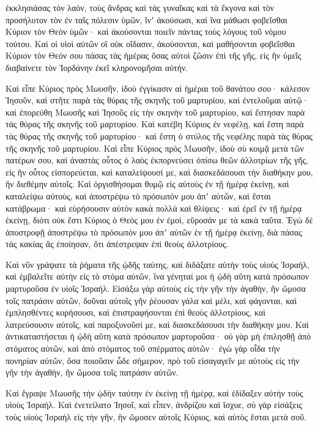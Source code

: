 {ἐκκλησιάσας τὸν λαὸν, τοὺς ἄνδρας καὶ τὰς γυναῖκας καὶ τὰ ἔκγονα καὶ τὸν προσήλυτον τὸν ἐν ταῖς πόλεσιν ὑμῶν, ἵνʼ ἀκούσωσι, καὶ ἵνα μάθωσι φοβεῖσθαι Κύριον τὸν Θεὸν ὑμῶν· καὶ ἀκούσονται ποιεῖν πάντας τοὺς λόγους τοῦ νόμου τούτου.
Καὶ οἱ υἱοὶ αὐτῶν οἳ οὐκ οἴδασιν, ἀκούσονται, καὶ μαθήσονται φοβεῖσθαι Κύριον τὸν Θεόν σου πάσας τὰς ἡμέρας ὅσας αὐτοὶ ζῶσιν ἐπὶ τῆς γῆς, εἰς ἣν ὑμεῖς διαβαίνετε τὸν Ἰορδάνην ἐκεῖ κληρονομῆσαι αὐτήν.
\par }{\PP {}Καὶ εἶπε Κύριος πρὸς Μωυσῆν, ἰδοὺ ἐγγίκασιν αἱ ἡμέραι τοῦ θανάτου σου· κάλεσον Ἰησοῦν, καὶ στῆτε παρὰ τὰς θύρας τῆς σκηνῆς τοῦ μαρτυρίου, καὶ ἐντελοῦμαι αὐτῷ· καὶ ἐπορεύθη Μωυσῆς καὶ Ἰησοῦς εἰς τὴν σκηνὴν τοῦ μαρτυρίου, καὶ ἔστησαν παρὰ τὰς θύρας τῆς σκηνῆς τοῦ μαρτυρίου.
Καὶ κατέβη Κύριος ἐν νεφέλῃ, καὶ ἔστη παρὰ τὰς θύρας τῆς σκηνῆς τοῦ μαρτυρίου· καὶ ἔστη ὁ στύλος τῆς νεφέλης παρὰ τὰς θύρας τῆς σκηνῆς τοῦ μαρτυρίου.
Καὶ εἶπε Κύριος πρὸς Μωυσῆν, ἰδοὺ σὺ κοιμᾷ μετὰ τῶν πατέρων σου, καὶ ἀναστὰς οὗτος ὁ λαὸς ἐκπορνεύσει ὀπίσω θεῶν ἀλλοτρίων τῆς γῆς, εἰς ἣν οὗτος εἰσπορεύεται, καὶ καταλείψουσί με, καὶ διασκεδάσουσι τὴν διαθήκην μου, ἣν διεθέμην αὐτοῖς.
Καὶ ὀργισθήσομαι θυμῷ εἰς αὐτοὺς ἐν τῇ ἡμέρᾳ ἐκείνῃ, καὶ καταλείψω αὐτοὺς, καὶ ἀποστρέψω τὸ πρόσωπόν μου ἀπʼ αὐτῶν, καὶ ἔσται κατάβρωμα· καὶ εὑρήσουσιν αὐτὸν κακὰ πολλὰ καὶ θλίψεις· καὶ ἐρεῖ ἐν τῇ ἡμέρᾳ ἐκείνῃ, διότι οὐκ ἔστι Κύριος ὁ Θεός μου ἐν ἐμοὶ, εὕροσάν με τὰ κακὰ ταῦτα.
Ἐγὼ δὲ ἀποστροφῇ ἀποστρέψω τὸ πρόσωπόν μου ἀπʼ αὐτῶν ἐν τῇ ἡμέρᾳ ἐκείνῃ, διὰ πάσας τὰς κακίας ἃς ἐποίησαν, ὅτι ἀπέστρεψαν ἐπὶ θεοὺς ἀλλοτρίους.
\par }{\PP {}Καὶ νῦν γράψατε τὰ ῥήματα τῆς ᾠδῆς ταύτης, καὶ διδάξατε αὐτὴν τοὺς υἱοὺς Ἰσραὴλ, καὶ ἐμβαλεῖτε αὐτὴν εἰς τὸ στόμα αὐτῶν, ἵνα γένηταί μοι ἡ ᾠδὴ αὕτη κατὰ πρόσωπον μαρτυροῦσα ἐν υἱοῖς Ἰσραήλ.
Εἰσάξω γὰρ αὐτοὺς εἰς τὴν γῆν τὴν ἀγαθὴν, ἣν ὤμοσα τοῖς πατράσιν αὐτῶν, δοῦναι αὐτοῖς γῆν ῥέουσαν γάλα καὶ μέλι, καὶ φάγονται, καὶ ἐμπλησθέντες κορήσουσι, καὶ ἐπιστραφήσονται ἐπὶ θεοὺς ἀλλοτρίους, καὶ λατρεύσουσιν αὐτοῖς, καὶ παροξυνοῦσί με, καὶ διασκεδάσουσι τὴν διαθήκην μου.
Καὶ ἀντικαταστήσεται ἡ ᾠδὴ αὕτη κατὰ πρόσωπον μαρτυροῦσα· οὐ γὰρ μὴ ἐπιλησθῇ ἀπὸ στόματος αὐτῶν, καὶ ἀπὸ στόματος τοῦ σπέρματος αὐτῶν· ἐγὼ γὰρ οἶδα τὴν πονηρίαν αὐτῶν, ὅσα ποιοῦσιν ὧδε σήμερον, πρὸ τοῦ εἰσαγαγεῖν με αὐτοὺς εἰς τὴν γῆν τὴν ἀγαθὴν, ἣν ὤμοσα τοῖς πατράσιν αὐτῶν.
\par }{\PP {}Καὶ ἔγραψε Μωυσῆς τὴν ᾠδὴν ταύτην ἐν ἐκείνῃ τῇ ἡμέρᾳ, καὶ ἐδίδαξεν αὐτὴν τοὺς υἱοὺς Ἰσραήλ.
Καὶ ἐνετείλατο Ἰησοῖ, καὶ εἶπεν, ἀνδρίζου καὶ ἴσχυε, σὺ γὰρ εἰσάξεις τοὺς υἱοὺς Ἰσραὴλ εἰς τὴν γῆν, ἣν ὤμοσεν αὐτοῖς Κύριος, καὶ αὐτὸς ἔσται μετὰ σοῦ.
}
